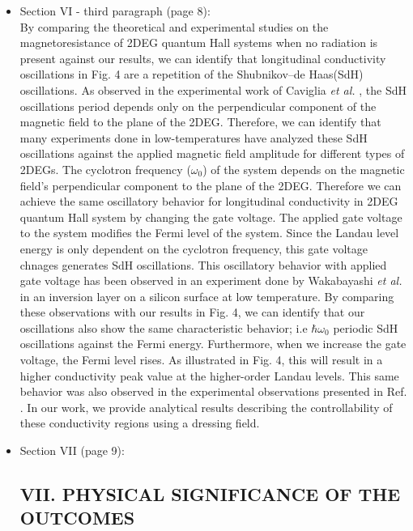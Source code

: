 \documentclass{article}
\begin{document}
\begin{itemize}
  \item Section VI - third paragraph (page 8):\\
  {\color{Red}
  By comparing the theoretical \cite{ando72,ando74_1,ando74_2,ando74_3,ando74_4,ando82,endo09} and experimental \cite{endo09,wakabayashi78,ochiai190,mancoff96,arapov02,grbic04,caviglia10} studies on the magnetoresistance of 2DEG quantum Hall systems when no radiation is present against our results, we can identify that longitudinal conductivity oscillations in Fig. 4 are a repetition of the Shubnikov–de Haas(SdH) oscillations.
  As observed in the experimental work of Caviglia \textit{et al.} \cite{caviglia10}, the SdH oscillations period depends only on the perpendicular component of the magnetic field to the plane of the 2DEG.
  Therefore, we can identify that many experiments done in low-temperatures \cite{endo09,ochiai190,mancoff96,arapov02,grbic04,caviglia10} have analyzed these SdH oscillations against the applied magnetic field amplitude for different types of 2DEGs.
  The cyclotron frequency ($\omega_0$) of the system depends on the magnetic field's perpendicular component to the plane of the 2DEG.
  Therefore we can achieve the same oscillatory behavior for longitudinal conductivity in 2DEG quantum Hall system by changing the gate voltage.
  The applied gate voltage to the system modifies the Fermi level of the system.
  Since the Landau level energy is only dependent on the cyclotron frequency, this gate voltage chnages generates SdH oscillations.
  This oscillatory behavior with applied gate voltage has been observed in an  experiment done by Wakabayashi \textit{et al.} \cite{wakabayashi78} in an inversion layer on a silicon surface at low temperature.
  By comparing these observations with our results in Fig. 4, we can identify that our oscillations also show the same characteristic behavior; i.e  $\hbar\omega_0$ periodic SdH oscillations against the Fermi energy.
  Furthermore, when we increase the gate voltage, the Fermi level rises. As illustrated in Fig. 4, this will result in a higher conductivity peak value at the higher-order Landau levels. This same behavior was also observed in the experimental observations presented in Ref. \cite{wakabayashi78}.
  In our work, we provide analytical results describing the controllability of these conductivity regions using a dressing field.
  }
  \item Section VII (page 9):\\
  {\color{Red}
  \subsection*{VII. PHYSICAL SIGNIFICANCE OF THE OUTCOMES}

}
\end{itemize}
\end{document}

